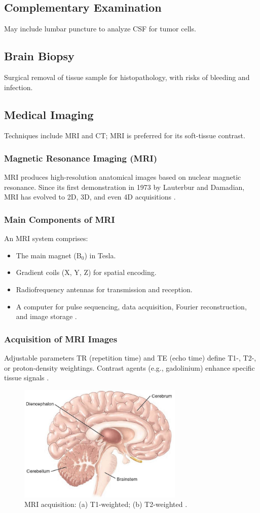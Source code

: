 \subsection{Complementary Examination}
May include lumbar puncture to analyze CSF for tumor cells.

\subsection{Brain Biopsy}
Surgical removal of tissue sample for histopathology, with risks of bleeding and infection.

\subsection{Medical Imaging}
Techniques include MRI and CT; MRI is preferred for its soft-tissue contrast.

\subsubsection{Magnetic Resonance Imaging (MRI)}
MRI produces high-resolution anatomical images based on nuclear magnetic resonance. Since its first demonstration in 1973 by Lauterbur and Damadian, MRI has evolved to 2D, 3D, and even 4D acquisitions \cite{ref10}.

\subsubsection{Main Components of MRI}
An MRI system comprises:
\begin{itemize}
  \item The main magnet (B$_0$) in Tesla.
  \item Gradient coils (X, Y, Z) for spatial encoding.
  \item Radiofrequency antennas for transmission and reception.
  \item A computer for pulse sequencing, data acquisition, Fourier reconstruction, and image storage \cite{ref11,ref12}.
\end{itemize}

\subsubsection{Acquisition of MRI Images}
Adjustable parameters TR (repetition time) and TE (echo time) define T1-, T2-, or proton-density weightings. Contrast agents (e.g., gadolinium) enhance specific tissue signals \cite{ref11}.

\begin{figure}[ht]
  \centering
  \includegraphics[width=0.7\textwidth]{./Images/Chapter0/brain.jpg}
  \caption{MRI acquisition: (a) T1-weighted; (b) T2-weighted \cite{ref11}.}
  \label{fig:mri-acquisition}
\end{figure}

